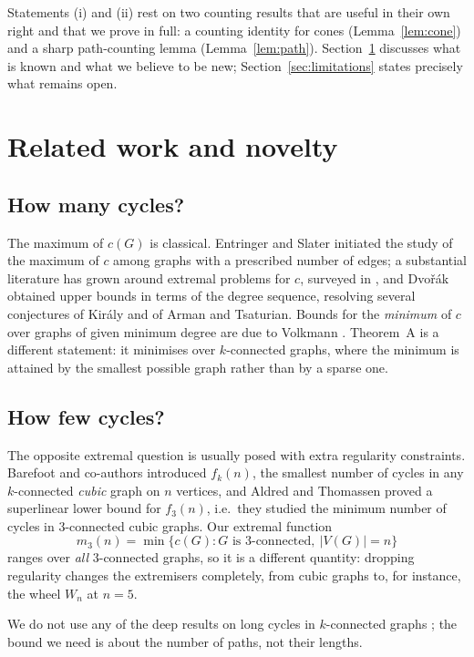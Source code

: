 \documentclass[11pt,a4paper]{article}
\theoremstyle{definition}
\newcommand{\Wi}{W_n}
\begin{document}
Statements (i) and (ii) rest on two counting results that are useful in their
own right and that we prove in full: a counting identity for cones
(Lemma~\ref{lem:cone}) and a sharp path-counting lemma
(Lemma~\ref{lem:path}).  Section~\ref{sec:related} discusses what is known and
what we believe to be new; Section~\ref{sec:limitations} states precisely what
remains open.

\section{Related work and novelty}\label{sec:related}

\subsection{How many cycles?}

The maximum of $c(G)$ is classical.  Entringer and Slater initiated the study
of the maximum of $c$ among graphs with a prescribed number of edges; a
substantial literature has grown around extremal problems for $c$, surveyed in
\cite{harary1973graphical}, and Dvo\v{r}\'ak \cite{dvorak2021} obtained upper
bounds in terms of the degree sequence, resolving several conjectures of
Kir\'aly and of Arman and Tsaturian.  Bounds for the \emph{minimum} of $c$ over
graphs of given minimum degree are due to Volkmann \cite{volkmann1996}.
Theorem~A is a different statement: it minimises over $k$-connected graphs,
where the minimum is attained by the smallest possible graph rather than by a
sparse one.

\subsection{How few cycles?}

The opposite extremal question is usually posed with extra regularity
constraints.  Barefoot and co-authors introduced $f_k(n)$, the smallest number
of cycles in any $k$-connected \emph{cubic} graph on $n$ vertices, and Aldred
and Thomassen \cite{aldred1997cycles} proved a superlinear lower bound for
$f_3(n)$, i.e.\ they studied the minimum number of cycles in $3$-connected
cubic graphs.  Our extremal function
\[
  m_3(n) = \min\{c(G) : G \text{ is } 3\text{-connected},\ |V(G)| = n\}
\]
ranges over \emph{all} $3$-connected graphs, so it is a different quantity:
dropping regularity changes the extremisers completely, from cubic graphs to,
for instance, the wheel $\Wi$ at $n=5$.

We do not use any of the deep results on long cycles in $k$-connected graphs
\cite{locke1982}; the bound we need is about the number of paths, not their
lengths.
\end{document}
